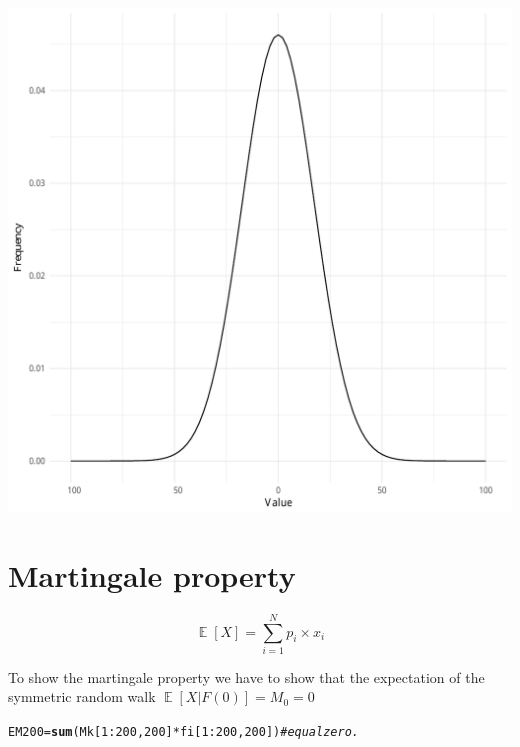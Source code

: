 \documentclass{article}\usepackage[]{graphicx}\usepackage[]{color}
\makeatletter
\def\maxwidth{ %
  \ifdim\Gin@nat@width>\linewidth
    \linewidth
  \else
    \Gin@nat@width
  \fi
}
\newcommand{\hlnum}[1]{\textcolor[rgb]{0.686,0.059,0.569}{#1}}%
\newcommand{\hlcom}[1]{\textcolor[rgb]{0.678,0.584,0.686}{\textit{#1}}}%
\newcommand{\hlopt}[1]{\textcolor[rgb]{0,0,0}{#1}}%
\newcommand{\hlstd}[1]{\textcolor[rgb]{0.345,0.345,0.345}{#1}}%
\newcommand{\hlkwb}[1]{\textcolor[rgb]{0.69,0.353,0.396}{#1}}%
\newcommand{\hlkwd}[1]{\textcolor[rgb]{0.737,0.353,0.396}{\textbf{#1}}}%
\newenvironment{kframe}{%
 \def\at@end@of@kframe{}%
 \ifinner\ifhmode%
  \def\at@end@of@kframe{\end{minipage}}%
  \begin{minipage}{\columnwidth}%
 \fi\fi%
 \def\FrameCommand##1{\hskip\@totalleftmargin \hskip-\fboxsep
 \colorbox{shadecolor}{##1}\hskip-\fboxsep
     \hskip-\linewidth \hskip-\@totalleftmargin \hskip\columnwidth}%
 \MakeFramed {\advance\hsize-\width
   \@totalleftmargin\z@ \linewidth\hsize
   \@setminipage}}%
 {\par\unskip\endMakeFramed%
 \at@end@of@kframe}
\newenvironment{knitrout}{}{} %
\makeatother
\begin{document}
\begin{knitrout}
\begin{kframe}
{\ttfamily\noindent\color{warningcolor}{\#\# Warning: Removed 200 rows containing missing values (geom\_path).}}\end{kframe}
\includegraphics[width=\maxwidth]{figure/unnamed-chunk-7-1} 

\end{knitrout}


\section{Martingale property}

\begin{equation}
\mathop{\mathbb{E}}[X] = \sum_{i=1}^N p_i \times x_i
\end{equation}

To show the martingale property we have to show that the expectation of the symmetric random walk $\mathop{\mathbb{E}}[X|F(0)] = M_0 = 0$

\begin{knitrout}
\color{fgcolor}\begin{kframe}
\begin{alltt}
 \hlstd{EM200} \hlkwb{=} \hlkwd{sum}\hlstd{(Mk[}\hlnum{1}\hlopt{:}\hlnum{200}\hlstd{,} \hlnum{200}\hlstd{]} \hlopt{*} \hlstd{fi[}\hlnum{1}\hlopt{:}\hlnum{200}\hlstd{,} \hlnum{200}\hlstd{])} \hlcom{# equal zero.}
\end{alltt}
\end{kframe}
\end{knitrout}
\end{document}
